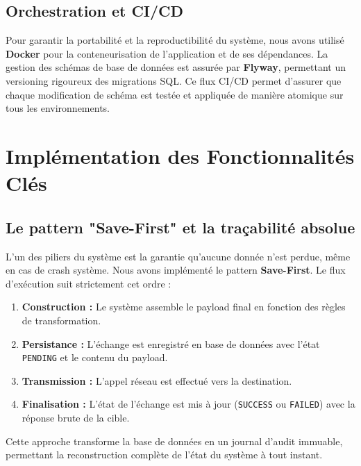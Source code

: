 \subsection{Orchestration et CI/CD}
Pour garantir la portabilité et la reproductibilité du système, nous avons utilisé \textbf{Docker} pour la conteneurisation de l'application et de ses dépendances. La gestion des schémas de base de données est assurée par \textbf{Flyway}, permettant un versioning rigoureux des migrations SQL. Ce flux CI/CD permet d'assurer que chaque modification de schéma est testée et appliquée de manière atomique sur tous les environnements.

\section{Implémentation des Fonctionnalités Clés}
\label{sec:impl_cles}

\subsection{Le pattern "Save-First" et la traçabilité absolue}
L'un des piliers du système est la garantie qu'aucune donnée n'est perdue, même en cas de crash système. Nous avons implémenté le pattern \textbf{Save-First}. Le flux d'exécution suit strictement cet ordre :
\begin{enumerate}
    \item \textbf{Construction :} Le système assemble le payload final en fonction des règles de transformation.
    \item \textbf{Persistance :} L'échange est enregistré en base de données avec l'état \texttt{PENDING} et le contenu du payload.
    \item \textbf{Transmission :} L'appel réseau est effectué vers la destination.
    \item \textbf{Finalisation :} L'état de l'échange est mis à jour (\texttt{SUCCESS} ou \texttt{FAILED}) avec la réponse brute de la cible.
\end{enumerate}
Cette approche transforme la base de données en un journal d'audit immuable, permettant la reconstruction complète de l'état du système à tout instant.

